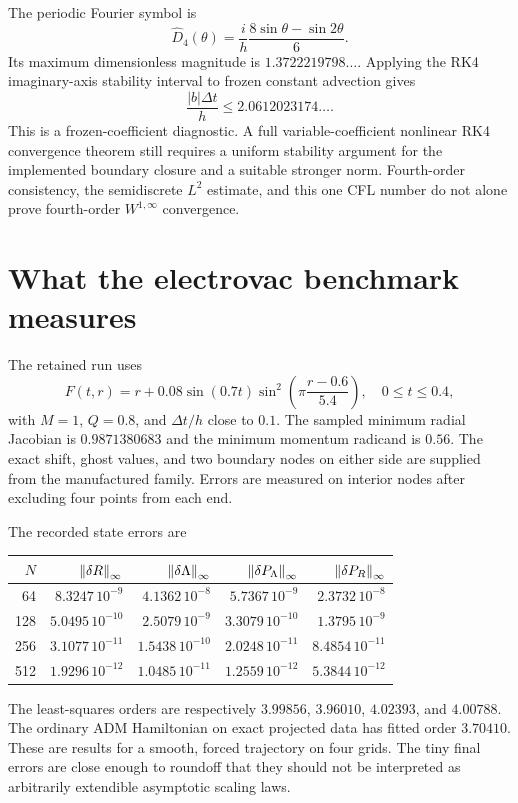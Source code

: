 The periodic Fourier symbol is
\begin{equation}
 \widehat D_4(\theta)=\frac{i}{h}\frac{8\sin\theta-\sin2\theta}{6}.
\end{equation}
Its maximum dimensionless magnitude is $1.3722219798\ldots$. Applying the RK4 imaginary-axis stability interval to frozen constant advection gives
\begin{equation}
 \frac{|b|\Delta t}{h}\le2.0612023174\ldots.
\end{equation}
This is a frozen-coefficient diagnostic. A full variable-coefficient nonlinear RK4 convergence theorem still requires a uniform stability argument for the implemented boundary closure and a suitable stronger norm. Fourth-order consistency, the semidiscrete $L^2$ estimate, and this one CFL number do not alone prove fourth-order $W^{1,\infty}$ convergence.

\section{What the electrovac benchmark measures}
\label{c:strong:electrovac-evidence}

The retained run uses
\begin{equation}
 F(t,r)=r+0.08\sin(0.7t)
                \sin^2\!\left(\pi\frac{r-0.6}{5.4}\right),
 \quad 0\le t\le0.4,
\end{equation}
with $M=1$, $Q=0.8$, and $\Delta t/h$ close to $0.1$. The sampled minimum radial Jacobian is $0.9871380683$ and the minimum momentum radicand is $0.56$. The exact shift, ghost values, and two boundary nodes on either side are supplied from the manufactured family. Errors are measured on interior nodes after excluding four points from each end.

The recorded state errors are
\begin{center}\small
\begin{tabular}{rrrrr}
\toprule
$N$&$\left\lVert\delta R\right\rVert_\infty$&$\left\lVert\delta\Lambda\right\rVert_\infty$&$\left\lVert\delta P_\Lambda\right\rVert_\infty$&$\left\lVert\delta P_R\right\rVert_\infty$\\
\midrule
64&$8.3247\,10^{-9}$&$4.1362\,10^{-8}$&$5.7367\,10^{-9}$&$2.3732\,10^{-8}$\\
128&$5.0495\,10^{-10}$&$2.5079\,10^{-9}$&$3.3079\,10^{-10}$&$1.3795\,10^{-9}$\\
256&$3.1077\,10^{-11}$&$1.5438\,10^{-10}$&$2.0248\,10^{-11}$&$8.4854\,10^{-11}$\\
512&$1.9296\,10^{-12}$&$1.0485\,10^{-11}$&$1.2559\,10^{-12}$&$5.3844\,10^{-12}$\\
\bottomrule
\end{tabular}
\end{center}
The least-squares orders are respectively $3.99856$, $3.96010$, $4.02393$, and $4.00788$. The ordinary ADM Hamiltonian on exact projected data has fitted order $3.70410$. These are results for a smooth, forced trajectory on four grids. The tiny final errors are close enough to roundoff that they should not be interpreted as arbitrarily extendible asymptotic scaling laws.

